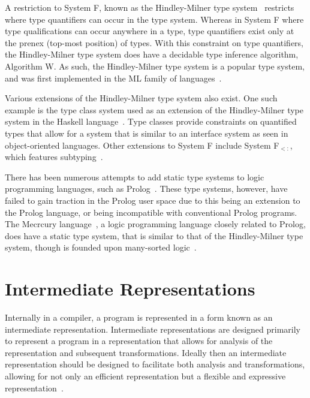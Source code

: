 A restriction to System F, known as the Hindley-Milner type system~\cite{hindley1969principal,milner1978theory,damas1984type} restricts where type quantifiers can occur in the type system. Whereas in System F where type qualifications can occur anywhere in a type, type quantifiers exist only at the prenex (top-most position) of types. With this constraint on type quantifiers, the Hindley-Milner type system does have a decidable type inference algorithm, Algorithm W. As such, the Hindley-Milner type system is a popular type system, and was first implemented in the ML family of languages~\cite{milner1997definition}.

Various extensions of the Hindley-Milner type system also exist. One such example is the type class system used as an extension of the Hindley-Milner type system in the Haskell language~\cite{wadler1989make}. Type classes provide constraints on quantified types that allow for a system that is similar to an interface system as seen in object-oriented languages. Other extensions to System F include System F${}_{<:}$, which features subtyping~\cite{cardelli1994extension}.

There has been numerous attempts to add static type systems to logic programming languages, such as Prolog~\cite{mycroft1984polymorphic, lakshman1991typed, nadathur1988overview}. These type systems, however, have failed to gain traction in the Prolog user space due to this being an extension to the Prolog language, or being incompatible with conventional Prolog programs. The Mecrcury language~\cite{somogyi1996execution}, a logic programming language closely related to Prolog, does have a static type system, that is similar to that of the Hindley-Milner type system, though is founded upon many-sorted logic~\cite{dietrich1988polymorphic}.

\section{Intermediate Representations}
\label{sec:lit-review--inter-reps}

Internally in a compiler, a program is represented in a form known as an intermediate representation. Intermediate representations are designed primarily to represent a program in a representation that allows for analysis of the representation and subsequent transformations. Ideally then an intermediate representation should be designed to facilitate both analysis and transformations, allowing for not only an efficient representation but a flexible and expressive representation~\cite{chow2013intermediate}.

